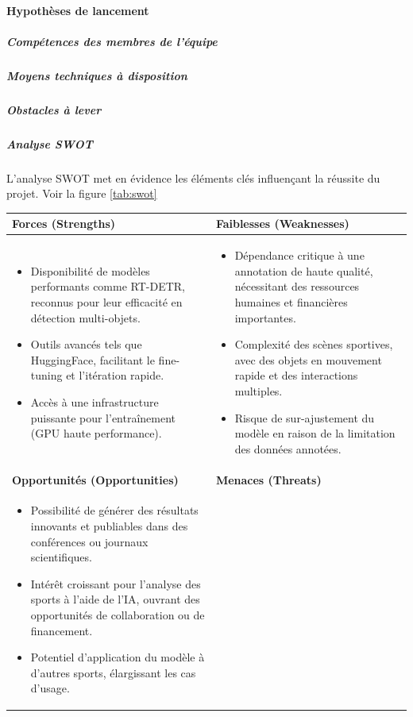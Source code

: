 \paragraph{Hypothèses de lancement}
    \subparagraph{Compétences des membres de l'équipe}
    \subparagraph{Moyens techniques à disposition}
    \subparagraph{Obstacles à lever}
    \subparagraph{Analyse SWOT}
    L’analyse SWOT met en évidence les éléments clés influençant la réussite du projet. Voir la figure \ref{tab:swot}
    \begin{table} [!h]
        \centering  
        \begin{tabular}{|p{7cm}|p{7cm}|}  
        \hline  
        \textbf{Forces (Strengths)} & \textbf{Faiblesses (Weaknesses)} \\  
        \hline  
        \begin{itemize}
        \item Disponibilité de modèles performants comme RT-DETR, reconnus pour leur efficacité en détection multi-objets. 
         \item Outils avancés tels que HuggingFace, facilitant le fine-tuning et l’itération rapide. 
         \item Accès à une infrastructure puissante pour l’entraînement (GPU haute performance). 
        \end{itemize}
        & 
        \begin{itemize}
         \item Dépendance critique à une annotation de haute qualité, nécessitant des ressources humaines et financières importantes. 
         \item Complexité des scènes sportives, avec des objets en mouvement rapide et des interactions multiples. 
         \item Risque de sur-ajustement du modèle en raison de la limitation des données annotées. 
        \end{itemize}\\
         \hline  
        \textbf{Opportunités (Opportunities)} & \textbf{Menaces (Threats)} \\  
        \hline  
        \begin{itemize}
            \item Possibilité de générer des résultats innovants et publiables dans des conférences ou journaux scientifiques.   
            \item Intérêt croissant pour l’analyse des sports à l’aide de l’IA, ouvrant des opportunités de collaboration ou de financement.  
            \item Potentiel d’application du modèle à d’autres sports, élargissant les cas d’usage.

\end{itemize}
\end{tabular}
\end{table}
